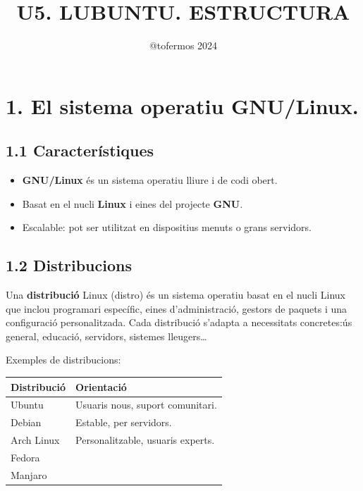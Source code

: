\documentclass[
  a4paper,
]{article}
\title{U5. LUBUNTU. ESTRUCTURA}
\author{@tofermos 2024}
\date{}
\providecommand{\tightlist}{%
  \setlength{\itemsep}{0pt}\setlength{\parskip}{0pt}}
\begin{document}
\maketitle

{
\setcounter{tocdepth}{2}
\tableofcontents
}
\newpage
\renewcommand\tablename{Tabla}

\section{1. El sistema operatiu
GNU/Linux.}\label{el-sistema-operatiu-gnulinux.}

\subsection{1.1 Característiques}\label{caracteruxedstiques}

\begin{itemize}
\tightlist
\item
  \textbf{GNU/Linux} és un sistema operatiu lliure i de codi obert.
\item
  Basat en el nucli \textbf{Linux} i eines del projecte \textbf{GNU}.
\item
  Escalable: pot ser utilitzat en dispositius menuts o grans servidors.
\end{itemize}

\subsection{1.2 Distribucions}\label{distribucions}

Una \textbf{distribució} Linux (distro) és un sistema operatiu basat en
el nucli Linux que inclou programari específic, eines d'administració,
gestors de paquets i una configuració personalitzada. Cada distribució
s'adapta a necessitats concretes:ús general, educació, servidors,
sistemes lleugers\ldots{}

Exemples de distribucions:

\begin{longtable}[]{@{}ll@{}}
\toprule\noalign{}
\textbf{Distribució} & \textbf{Orientació} \\
\midrule\noalign{}
\endhead
\bottomrule\noalign{}
\endlastfoot
Ubuntu & Usuaris nous, suport comunitari. \\
Debian & Estable, per servidors. \\
Arch Linux & Personalitzable, usuaris experts. \\
Fedora & \\
Manjaro & \\
\end{longtable}
\end{document}
